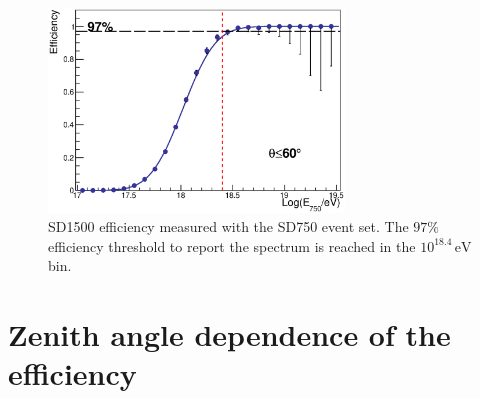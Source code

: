 \documentclass[12pt,a4paper]{article}
\newcommand{\eV}{\, \mathrm{eV}}
\begin{document}
\begin{figure}[h]
\begin{center}
 \includegraphics[width=0.7\textwidth]{plots/allZenith.eps}  
\caption{SD1500 efficiency measured with the SD750 event set. The $97\%$ efficiency threshold to report the spectrum is reached in the $10^{18.4}\eV$ bin.
\label{fig:allZenith}}
\end{center}
\end{figure} 



\section{Zenith angle dependence of the efficiency}
\label{sec:zenith}
\end{document}
